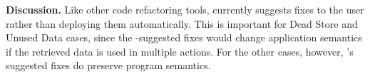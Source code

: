 \textbf{Discussion.}
Like other code refactoring tools, \Tool currently suggests fixes to the user rather than deploying them automatically. This is important for Dead Store and Unused Data cases, since the \Tool-suggested fixes would change application semantics if the retrieved data is used in multiple actions.
For the other cases, however, \Tool's suggested fixes do preserve program semantics.